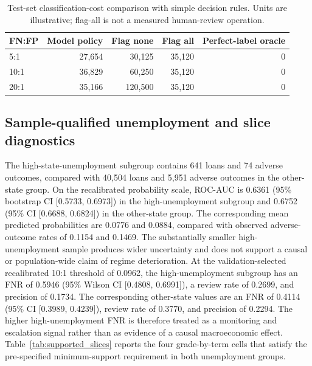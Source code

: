 \documentclass[10pt]{article}
\begin{document}
\begin{table}[!ht]
\centering
\caption{Test-set classification-cost comparison with simple decision rules. Units are illustrative; flag-all is not a measured human-review operation.}
\label{tab:r2_policy_benchmarks}
\begin{tabular}{lrrrr}
\toprule
FN:FP & Model policy & Flag none & Flag all & Perfect-label oracle \\
\midrule
5:1 & 27,654 & 30,125 & 35,120 & 0 \\
10:1 & 36,829 & 60,250 & 35,120 & 0 \\
20:1 & 35,166 & 120,500 & 35,120 & 0 \\
\bottomrule
\end{tabular}
\end{table}

\subsection{Sample-qualified unemployment and slice diagnostics}
\label{sec:subgroup}

The high-state-unemployment subgroup contains 641 loans and 74 adverse outcomes, compared with 40,504 loans and 5,951 adverse outcomes in the other-state group. On the recalibrated probability scale, ROC-AUC is 0.6361 (95\% bootstrap CI [0.5733, 0.6973]) in the high-unemployment subgroup and 0.6752 (95\% CI [0.6688, 0.6824]) in the other-state group. The corresponding mean predicted probabilities are 0.0776 and 0.0884, compared with observed adverse-outcome rates of 0.1154 and 0.1469. The substantially smaller high-unemployment sample produces wider uncertainty and does not support a causal or population-wide claim of regime deterioration. At the validation-selected recalibrated 10:1 threshold of 0.0962, the high-unemployment subgroup has an FNR of 0.5946 (95\% Wilson CI [0.4808, 0.6991]), a review rate of 0.2699, and precision of 0.1734. The corresponding other-state values are an FNR of 0.4114 (95\% CI [0.3989, 0.4239]), review rate of 0.3770, and precision of 0.2294. The higher high-unemployment FNR is therefore treated as a monitoring and escalation signal rather than as evidence of a causal macroeconomic effect. Table~\ref{tab:supported_slices} reports the four grade-by-term cells that satisfy the pre-specified minimum-support requirement in both unemployment groups.
\end{document}
